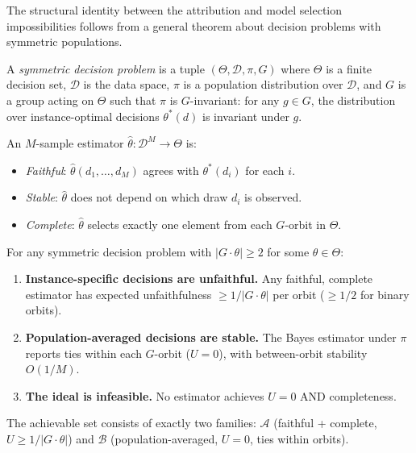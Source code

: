 \documentclass{jmlr}
\begin{document}
The structural identity between the attribution and model selection impossibilities follows from a general theorem about decision problems with symmetric populations.

\begin{definition}
\label{def:symmetric-decision}
A \emph{symmetric decision problem} is a tuple $(\Theta, \mathcal{D}, \pi, G)$ where $\Theta$ is a finite decision set, $\mathcal{D}$ is the data space, $\pi$ is a population distribution over $\mathcal{D}$, and $G$ is a group acting on $\Theta$ such that $\pi$ is $G$-invariant: for any $g \in G$, the distribution over instance-optimal decisions $\theta^*(d)$ is invariant under $g$.

An $M$-sample estimator $\hat\theta : \mathcal{D}^M \to \Theta$ is:
\begin{itemize}
    \item \emph{Faithful}: $\hat\theta(d_1, \ldots, d_M)$ agrees with $\theta^*(d_i)$ for each $i$.
    \item \emph{Stable}: $\hat\theta$ does not depend on which draw $d_i$ is observed.
    \item \emph{Complete}: $\hat\theta$ selects exactly one element from each $G$-orbit in $\Theta$.
\end{itemize}
\end{definition}

\begin{theorem}
\label{thm:bayes-dichotomy}
For any symmetric decision problem with $|G \cdot \theta| \geq 2$ for some $\theta \in \Theta$:
\begin{enumerate}
    \item[(i)] \textbf{Instance-specific decisions are unfaithful.} Any faithful, complete estimator has expected unfaithfulness $\geq 1/|G \cdot \theta|$ per orbit ($\geq 1/2$ for binary orbits).
    \item[(ii)] \textbf{Population-averaged decisions are stable.} The Bayes estimator under $\pi$ reports ties within each $G$-orbit ($U = 0$), with between-orbit stability $O(1/M)$.
    \item[(iii)] \textbf{The ideal is infeasible.} No estimator achieves $U = 0$ AND completeness.
\end{enumerate}
The achievable set consists of exactly two families: $\mathcal{A}$ (faithful + complete, $U \geq 1/|G \cdot \theta|$) and $\mathcal{B}$ (population-averaged, $U = 0$, ties within orbits).
\end{theorem}
\end{document}
